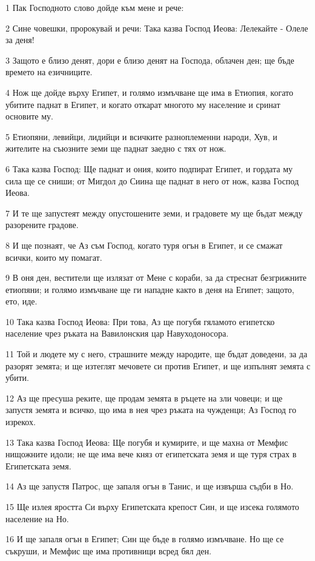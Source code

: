 \par 1 Пак Господното слово дойде към мене и рече:
\par 2 Сине човешки, пророкувай и речи: Така казва Господ Иеова: Лелекайте - Олеле за деня!
\par 3 Защото е близо денят, дори е близо денят на Господа, облачен ден; ще бъде времето на езичниците.
\par 4 Нож ще дойде върху Египет, и голямо измъчване ще има в Етиопия, когато убитите паднат в Египет, и когато откарат многото му население и сринат основите му.
\par 5 Етиопяни, левийци, лидийци и всичките разноплеменни народи, Хув, и жителите на съюзните земи ще паднат заедно с тях от нож.
\par 6 Така казва Господ: Ще паднат и ония, които подпират Египет, и гордата му сила ще се сниши; от Мигдол до Сиина ще паднат в него от нож, казва Господ Иеова.
\par 7 И те ще запустеят между опустошените земи, и градовете му ще бъдат между разорените градове.
\par 8 И ще познаят, че Аз съм Господ, когато туря огън в Египет, и се смажат всички, които му помагат.
\par 9 В оня ден, вестители ще излязат от Мене с кораби, за да стреснат безгрижните етиопяни; и голямо измъчване ще ги нападне както в деня на Египет; защото, ето, иде.
\par 10 Така казва Господ Иеова: При това, Аз ще погубя гяламото египетско население чрез ръката на Вавилонския цар Навуходоносора.
\par 11 Той и людете му с него, страшните между народите, ще бъдат доведени, за да разорят земята; и ще изтеглят мечовете си против Египет, и ще изпълнят земята с убити.
\par 12 Аз ще пресуша реките, ще продам земята в ръцете на зли човеци; и ще запустя земята и всичко, що има в нея чрез ръката на чужденци; Аз Господ го изрекох.
\par 13 Така казва Господ Иеова: Ще погубя и кумирите, и ще махна от Мемфис нищожните идоли; не ще има вече княз от египетската земя и ще туря страх в Египетската земя.
\par 14 Аз ще запустя Патрос, ще запаля огън в Танис, и ще извърша съдби в Но.
\par 15 Ще излея яростта Си върху Египетската крепост Син, и ще изсека голямото население на Но.
\par 16 И ще запаля огън в Египет; Син ще бъде в голямо измъчване. Но ще се съкруши, и Мемфис ще има противници всред бял ден.
